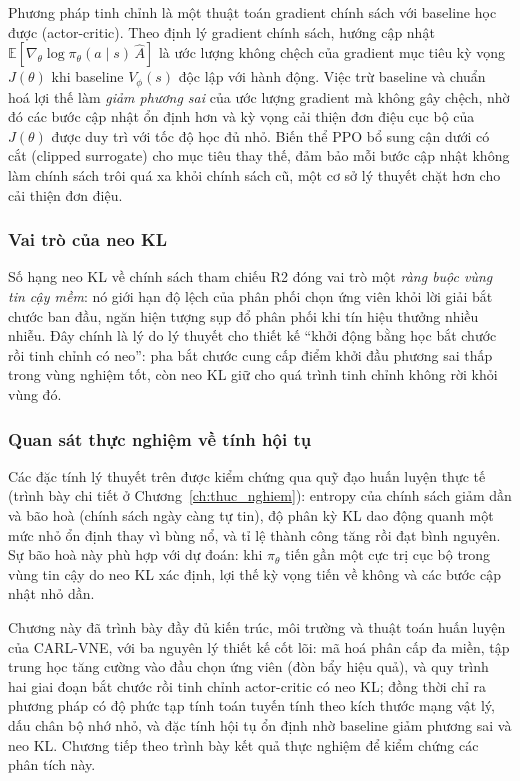 \documentclass[../DoAn.tex]{subfiles}
\begin{document}
Phương pháp tinh chỉnh là một thuật toán gradient chính sách với baseline học được (actor-critic). Theo định lý gradient chính sách, hướng cập nhật $\mathbb{E}[\nabla_\theta \log\pi_\theta(a\mid s)\,\hat{A}]$ là ước lượng không chệch của gradient mục tiêu kỳ vọng $J(\theta)$ khi baseline $V_\phi(s)$ độc lập với hành động. Việc trừ baseline và chuẩn hoá lợi thế làm \textit{giảm phương sai} của ước lượng gradient mà không gây chệch, nhờ đó các bước cập nhật ổn định hơn và kỳ vọng cải thiện đơn điệu cục bộ của $J(\theta)$ được duy trì với tốc độ học đủ nhỏ. Biến thể PPO bổ sung cận dưới có cắt (clipped surrogate) cho mục tiêu thay thế, đảm bảo mỗi bước cập nhật không làm chính sách trôi quá xa khỏi chính sách cũ, một cơ sở lý thuyết chặt hơn cho cải thiện đơn điệu.

\subsubsection{Vai trò của neo KL}
\label{subsec:conv-kl}

Số hạng neo KL về chính sách tham chiếu R2 đóng vai trò một \textit{ràng buộc vùng tin cậy mềm}: nó giới hạn độ lệch của phân phối chọn ứng viên khỏi lời giải bắt chước ban đầu, ngăn hiện tượng sụp đổ phân phối khi tín hiệu thưởng nhiều nhiễu. Đây chính là lý do lý thuyết cho thiết kế ``khởi động bằng học bắt chước rồi tinh chỉnh có neo'': pha bắt chước cung cấp điểm khởi đầu phương sai thấp trong vùng nghiệm tốt, còn neo KL giữ cho quá trình tinh chỉnh không rời khỏi vùng đó.

\subsubsection{Quan sát thực nghiệm về tính hội tụ}
\label{subsec:conv-empirical}

Các đặc tính lý thuyết trên được kiểm chứng qua quỹ đạo huấn luyện thực tế (trình bày chi tiết ở Chương~\ref{ch:thuc_nghiem}): entropy của chính sách giảm dần và bão hoà (chính sách ngày càng tự tin), độ phân kỳ KL dao động quanh một mức nhỏ ổn định thay vì bùng nổ, và tỉ lệ thành công tăng rồi đạt bình nguyên. Sự bão hoà này phù hợp với dự đoán: khi $\pi_\theta$ tiến gần một cực trị cục bộ trong vùng tin cậy do neo KL xác định, lợi thế kỳ vọng tiến về không và các bước cập nhật nhỏ dần.

Chương này đã trình bày đầy đủ kiến trúc, môi trường và thuật toán huấn luyện của CARL-VNE, với ba nguyên lý thiết kế cốt lõi: mã hoá phân cấp đa miền, tập trung học tăng cường vào đầu chọn ứng viên (đòn bẩy hiệu quả), và quy trình hai giai đoạn bắt chước rồi tinh chỉnh actor-critic có neo KL; đồng thời chỉ ra phương pháp có độ phức tạp tính toán tuyến tính theo kích thước mạng vật lý, dấu chân bộ nhớ nhỏ, và đặc tính hội tụ ổn định nhờ baseline giảm phương sai và neo KL. Chương tiếp theo trình bày kết quả thực nghiệm để kiểm chứng các phân tích này.

\let\addcontentsline\savedaddcontentsline %
\end{document}
